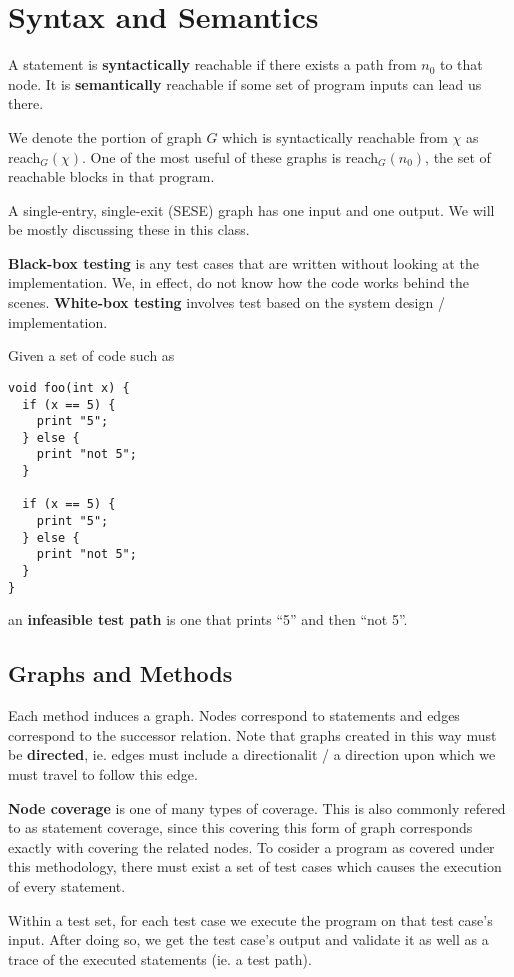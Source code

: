 \documentclass[12pt]{article}
\begin{document}
\section{Syntax and Semantics}
A statement is {\bf syntactically} reachable if there exists a path from $n_0$ to that node. It is {\bf semantically} reachable if some set of program inputs can lead us there.

We denote the portion of graph $G$ which is syntactically reachable from $\chi$ as reach${}_G (\chi)$. One of the most useful of these graphs is reach${}_G (n_0)$, the set of reachable blocks in that program.

A single-entry, single-exit (SESE) graph has one input and one output. We will be mostly discussing these in this class.

{\bf Black-box testing} is any test cases that are written without looking at the implementation. We, in effect, do not know how the code works behind the scenes. {\bf White-box testing} involves test based on the system design / implementation.

Given a set of code such as
\begin{verbatim}
void foo(int x) {
  if (x == 5) {
    print "5";
  } else {
    print "not 5";
  }

  if (x == 5) {
    print "5";
  } else {
    print "not 5";
  }
}
\end{verbatim}
an {\bf infeasible test path} is one that prints ``5'' and then ``not 5''.

\subsection{Graphs and Methods}
Each method induces a graph. Nodes correspond to statements and edges correspond to the successor relation. Note that graphs created in this way must be {\bf directed}, ie. edges must include a directionalit / a direction upon which we must travel to follow this edge.

{\bf Node coverage} is one of many types of coverage. This is also commonly refered to as statement coverage, since this covering this form of graph corresponds exactly with covering the related nodes. To cosider a program as covered under this methodology, there must exist a set of test cases which causes the execution of every statement.

Within a test set, for each test case we execute the program on that test case's input. After doing so, we get the test case's output and validate it as well as a trace of the executed statements (ie. a test path).
\end{document}
